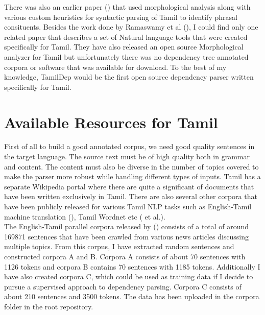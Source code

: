 \documentclass[11pt,letterpaper]{article}
\begin{document}
There was also an earlier paper (\cite{dhanalakshmi2010natural}) that used morphological analysis along with various custom heuristics for syntactic parsing
of Tamil to identify phrasal consituents. Besides the work done by Ramaswamy et al (\cite{ramasamy2011tamil}), I could find only one related paper that describes
a set of Natural language tools that were created specifically for Tamil. They have also released an open source Morphological analyzer
for Tamil but unfortunately there was no dependency tree annotated corpora or software that was available for download. To the best of my knowledge, TamilDep would be 
the first open source dependency parser written specifically for Tamil. 

\section{Available Resources for Tamil}

First of all to build a good annotated corpus, we need good quality sentences in the target language. 
The source text must be of high quality both in grammar and content. 
The content must also be diverse in the number of topics covered to make the parser more robust while handling different types of inputs. 
Tamil has a separate Wikipedia portal where there are quite a significant of documents that have been written exclusively in Tamil. 
There are also several other corpora that have been publicly
released for various Tamil NLP tasks such as English-Tamil machine translation (\cite{RaBoMorphologicalProcessing2012}), Tamil Wordnet etc (\cite{rajendran2002tamil} et al.). \\

The English-Tamil parallel corpora released by (\cite{ramasamy2011tamil}) consists of a total of around 169871 sentences that have been crawled
from various news articles discussing multiple topics. From this corpus, I have extracted random sentences and 
constructed corpora A and B. Corpora A consists of about 70 sentences with 1126 tokens and corpora B contains 70 sentences with 1185 tokens. Additionally I have also 
created corpora C, which could be used as training data if I decide to pursue a supervised approach to dependency parsing. Corpora C
consists of about 210 sentences and 3500 tokens. The data has been uploaded in the corpora folder in the root repository. \\
\end{document}
